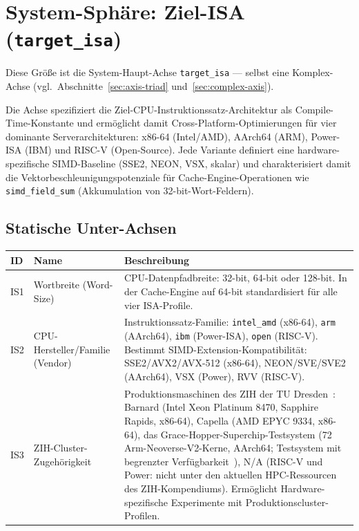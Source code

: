\section{System-Sphäre: Ziel-ISA (\texttt{target\_isa})}

Diese Größe ist die System-Haupt-Achse \texttt{target\_isa} --- selbst eine Komplex-Achse (vgl.\ Abschnitte~\ref{sec:axis-triad} und~\ref{sec:complex-axis}).

Die Achse spezifiziert die Ziel-CPU-Instruktionssatz-Architektur als Compile-Time-Konstante und ermöglicht damit Cross-Platform-Optimierungen für vier dominante Serverarchitekturen: x86-64 (Intel/\allowbreak{}AMD), AArch64 (ARM), Power-ISA (IBM) und RISC-V (Open-Source). Jede Variante definiert eine hardware-spezifische SIMD-Baseline (SSE2, NEON, VSX, skalar) und charakterisiert damit die Vektorbeschleunigungspotenziale für Cache-Engine-Operationen wie \texttt{simd\_\allowbreak{}field\_\allowbreak{}sum} (Akkumulation von 32-bit-Wort-Feldern).

\subsection*{Statische Unter-Achsen}

\begin{scriptsize}
\begin{longtable}{@{}>{\raggedright\arraybackslash}p{1.8cm} >{\raggedright\arraybackslash}p{3.2cm} >{\raggedright\arraybackslash}p{8.5cm}@{}}
\toprule
ID & Name & Beschreibung \\
\midrule
\endhead%
IS1 & Wortbreite (Word-Size) & CPU-Datenpfadbreite: 32-bit, 64-bit oder 128-bit. In der Cache-Engine auf 64-bit standardisiert für alle vier ISA-Profile. \\
IS2 & CPU-Hersteller/\allowbreak{}Familie (Vendor) & Instruktionssatz-Familie: \texttt{intel\_\allowbreak{}amd} (x86-64), \texttt{arm} (AArch64), \texttt{ibm} (Power-ISA), \texttt{open} (RISC-V). Bestimmt SIMD-Extension-Kompatibilität: SSE2/\allowbreak{}AVX2/\allowbreak{}AVX-512 (x86-64), NEON/\allowbreak{}SVE/\allowbreak{}SVE2 (AArch64), VSX (Power), RVV (RISC-V). \\
IS3 & ZIH-Cluster-Zugehörigkeit & Produktionsmaschinen des ZIH der TU Dresden~\cite{zih_hpc_compendium_hardware}: Barnard (Intel Xeon Platinum 8470, Sapphire Rapids, x86-64), Capella (AMD EPYC 9334, x86-64), das Grace-Hopper-Superchip-Testsystem (72 Arm-Neoverse-V2-Kerne, AArch64; Testsystem mit begrenzter Verfügbarkeit~\cite{zih_hpc_compendium_gh200}), N/\allowbreak{}A (RISC-V und Power: nicht unter den aktuellen HPC-Ressourcen des ZIH-Kompendiums). Ermöglicht Hardware-spezifische Experimente mit Produktionscluster-Profilen. \\
\bottomrule
\end{longtable}
\end{scriptsize}

